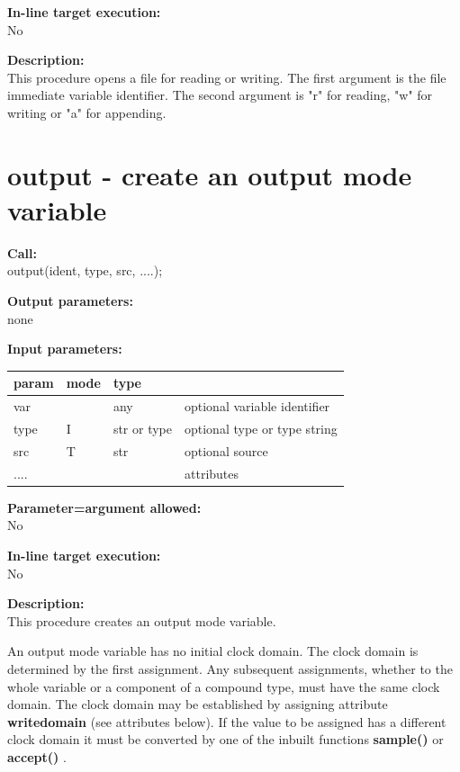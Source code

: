         {\bf In-line target execution:} \\
        No
        
        {\bf Description:} \\
        This procedure opens a file for reading or writing.
        The first argument is the file immediate variable identifier.
        The second argument is "r" for reading, "w" for writing or
        "a" for appending.



    \section{output - create an output mode variable}\label{sec:ipoutput}
        
        {\bf Call:} \\
        output(ident, type, src, ....);
        
        {\bf Output parameters:} \\
        none
        
        {\bf Input parameters:} \\
        \begin{tabular}{| l | l | l | l |}
        \hline
        param  & mode     & type  & \\
        \hline \hline
        var     &     & any          & optional variable identifier  \\ \hline
        type    & I   & str or type  & optional type or type string  \\ \hline
        src     & T   & str          & optional source               \\ \hline
        ....    &     &              & attributes                    \\ \hline
        \end{tabular}
        
        {\bf Parameter=argument allowed:} \\
        No
        
        {\bf In-line target execution:} \\
        No
        
        {\bf Description:} \\
        This procedure creates an output mode variable.

        An output mode variable has no initial clock domain. The clock domain is
        determined by the first assignment. Any subsequent assignments, whether to
        the whole variable or a component of a compound type, must have the same
        clock domain. The clock domain may be established by assigning attribute
        {\bf writedomain} (see attributes below). If the value to be
        assigned has a different clock domain it must be converted by one of the
        inbuilt functions {\bf sample()}  or {\bf accept()}
        .
        
